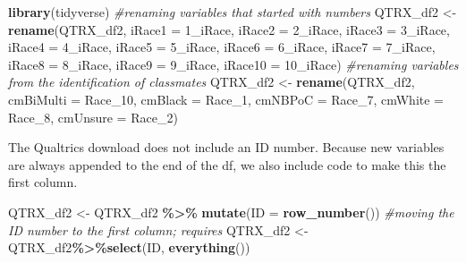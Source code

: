 \documentclass[
  11pt,
]{book}
\newenvironment{Shaded}{\begin{snugshade}}{\end{snugshade}}
\newcommand{\AttributeTok}[1]{\textcolor[rgb]{0.27,0.27,0.27}{#1}}
\newcommand{\CommentTok}[1]{\textcolor[rgb]{0.37,0.37,0.37}{\textit{#1}}}
\newcommand{\FunctionTok}[1]{\textcolor[rgb]{0.27,0.27,0.27}{\textbf{#1}}}
\newcommand{\NormalTok}[1]{#1}
\newcommand{\OtherTok}[1]{\textcolor[rgb]{0.37,0.37,0.37}{#1}}
\newcommand{\SpecialCharTok}[1]{\textcolor[rgb]{0.43,0.43,0.43}{\textbf{#1}}}
\newcommand{\StringTok}[1]{\textcolor[rgb]{0.5,0.5,0.5}{#1}}
\begin{document}
\begin{Shaded}
\begin{Highlighting}[]
\FunctionTok{library}\NormalTok{(tidyverse)}
\CommentTok{\#renaming variables that started with numbers}
\NormalTok{QTRX\_df2 }\OtherTok{\textless{}{-}} \FunctionTok{rename}\NormalTok{(QTRX\_df2, }\AttributeTok{iRace1 =} \StringTok{\textquotesingle{}1\_iRace\textquotesingle{}}\NormalTok{, }\AttributeTok{iRace2 =} \StringTok{\textquotesingle{}2\_iRace\textquotesingle{}}\NormalTok{, }\AttributeTok{iRace3 =} \StringTok{\textquotesingle{}3\_iRace\textquotesingle{}}\NormalTok{, }\AttributeTok{iRace4 =} \StringTok{\textquotesingle{}4\_iRace\textquotesingle{}}\NormalTok{, }\AttributeTok{iRace5 =} \StringTok{\textquotesingle{}5\_iRace\textquotesingle{}}\NormalTok{, }\AttributeTok{iRace6 =} \StringTok{\textquotesingle{}6\_iRace\textquotesingle{}}\NormalTok{, }\AttributeTok{iRace7 =} \StringTok{\textquotesingle{}7\_iRace\textquotesingle{}}\NormalTok{, }\AttributeTok{iRace8 =} \StringTok{\textquotesingle{}8\_iRace\textquotesingle{}}\NormalTok{, }\AttributeTok{iRace9 =} \StringTok{\textquotesingle{}9\_iRace\textquotesingle{}}\NormalTok{, }\AttributeTok{iRace10 =} \StringTok{\textquotesingle{}10\_iRace\textquotesingle{}}\NormalTok{)}
\CommentTok{\#renaming variables from the identification of classmates}
\NormalTok{QTRX\_df2 }\OtherTok{\textless{}{-}} \FunctionTok{rename}\NormalTok{(QTRX\_df2, }\AttributeTok{cmBiMulti =}\NormalTok{ Race\_10, }\AttributeTok{cmBlack =}\NormalTok{ Race\_1, }\AttributeTok{cmNBPoC =}\NormalTok{ Race\_7, }\AttributeTok{cmWhite =}\NormalTok{ Race\_8, }\AttributeTok{cmUnsure =}\NormalTok{ Race\_2)}
\end{Highlighting}
\end{Shaded}

The Qualtrics download does not include an ID number. Because new variables are always appended to the end of the df, we also include code to make this the first column.

\begin{Shaded}
\begin{Highlighting}[]
\NormalTok{QTRX\_df2 }\OtherTok{\textless{}{-}}\NormalTok{ QTRX\_df2 }\SpecialCharTok{\%\textgreater{}\%} \FunctionTok{mutate}\NormalTok{(}\AttributeTok{ID =} \FunctionTok{row\_number}\NormalTok{())}
\CommentTok{\#moving the ID number to the first column; requires }
\NormalTok{QTRX\_df2 }\OtherTok{\textless{}{-}}\NormalTok{ QTRX\_df2}\SpecialCharTok{\%\textgreater{}\%}\FunctionTok{select}\NormalTok{(ID, }\FunctionTok{everything}\NormalTok{())}
\end{Highlighting}
\end{Shaded}
\end{document}
